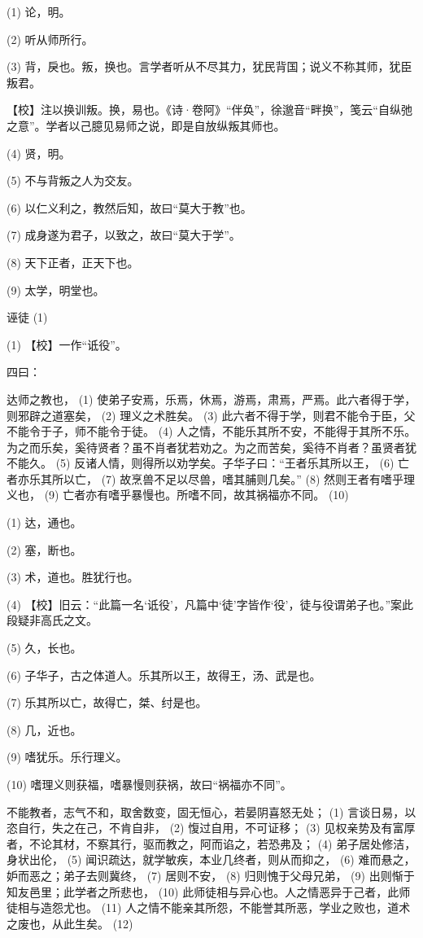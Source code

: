 \documentclass[12pt,UTF8]{ctexbook}
\begin{document}
(1) 论，明。

(2) 听从师所行。

(3) 背，戾也。叛，换也。言学者听从不尽其力，犹民背国；说义不称其师，犹臣叛君。

【校】注以换训叛。换，易也。《诗·卷阿》“伴奂”，徐邈音“畔换”，笺云“自纵弛之意”。学者以己臆见易师之说，即是自放纵叛其师也。

(4) 贤，明。

(5) 不与背叛之人为交友。

(6) 以仁义利之，教然后知，故曰“莫大于教”也。

(7) 成身遂为君子，以致之，故曰“莫大于学”。

(8) 天下正者，正天下也。

(9) 太学，明堂也。





诬徒 (1)


(1) 【校】一作“诋役”。

四曰：

达师之教也， (1) 使弟子安焉，乐焉，休焉，游焉，肃焉，严焉。此六者得于学，则邪辟之道塞矣， (2) 理义之术胜矣。 (3) 此六者不得于学，则君不能令于臣，父不能令于子，师不能令于徒。 (4) 人之情，不能乐其所不安，不能得于其所不乐。为之而乐矣，奚待贤者？虽不肖者犹若劝之。为之而苦矣，奚待不肖者？虽贤者犹不能久。 (5) 反诸人情，则得所以劝学矣。子华子曰：“王者乐其所以王， (6) 亡者亦乐其所以亡， (7) 故烹兽不足以尽兽，嗜其脯则几矣。” (8) 然则王者有嗜乎理义也， (9) 亡者亦有嗜乎暴慢也。所嗜不同，故其祸福亦不同。 (10)

(1) 达，通也。

(2) 塞，断也。

(3) 术，道也。胜犹行也。

(4) 【校】旧云：“此篇一名‘诋役’，凡篇中‘徒’字皆作‘役’，徒与役谓弟子也。”案此段疑非高氏之文。

(5) 久，长也。

(6) 子华子，古之体道人。乐其所以王，故得王，汤、武是也。

(7) 乐其所以亡，故得亡，桀、纣是也。

(8) 几，近也。

(9) 嗜犹乐。乐行理义。

(10) 嗜理义则获福，嗜暴慢则获祸，故曰“祸福亦不同”。

不能教者，志气不和，取舍数变，固无恒心，若晏阴喜怒无处； (1) 言谈日易，以恣自行，失之在己，不肯自非， (2) 愎过自用，不可证移； (3) 见权亲势及有富厚者，不论其材，不察其行，驱而教之，阿而谄之，若恐弗及； (4) 弟子居处修洁，身状出伦， (5) 闻识疏达，就学敏疾，本业几终者，则从而抑之， (6) 难而悬之，妒而恶之；弟子去则冀终， (7) 居则不安， (8) 归则愧于父母兄弟， (9) 出则惭于知友邑里；此学者之所悲也， (10) 此师徒相与异心也。人之情恶异于己者，此师徒相与造怨尤也。 (11) 人之情不能亲其所怨，不能誉其所恶，学业之败也，道术之废也，从此生矣。 (12)
\end{document}
